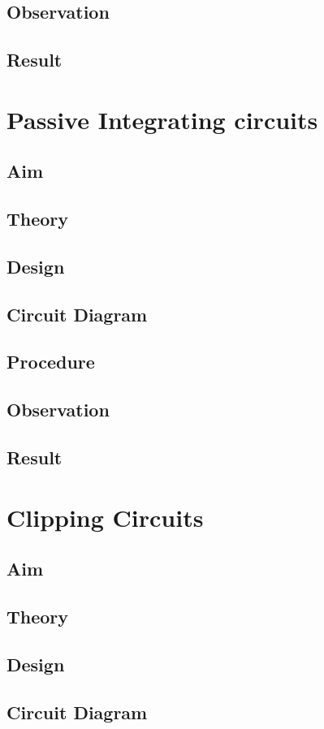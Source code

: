 \documentclass{book}
\begin{document}
\section*{Observation}
\section*{Result}
\chapter[Passive Integrating Circuits]{Passive Integrating circuits}
\section*{Aim}
\section*{Theory}
\section*{Design}
\section*{Circuit Diagram}
\section*{Procedure}
\section*{Observation}
\section*{Result}
\chapter[Clipping Circuits]{Clipping Circuits}
\section*{Aim}
\section*{Theory}
\section*{Design}
\section*{Circuit Diagram}
\end{document}
